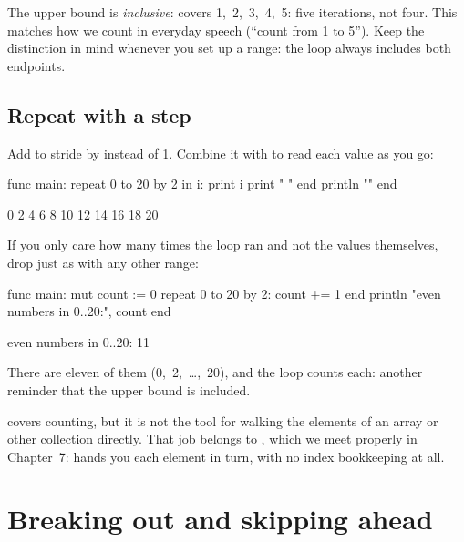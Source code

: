 \begin{note}
The upper bound is \emph{inclusive}:  covers
1,~2,~3,~4,~5: five iterations, not four. This matches how we count in everyday
speech (``count from 1 to 5''). Keep the distinction in mind whenever you set
up a range: the loop always includes both endpoints.
\end{note}

\subsection{Repeat with a step}

Add  to stride by  instead of 1. Combine it with 
to read each value as you go:

\begin{salamen}
func main:
    repeat 0 to 20 by 2 in i:
        print i
        print " "
    end
    println ""
end
\end{salamen}

\begin{progout}
0 2 4 6 8 10 12 14 16 18 20
\end{progout}

If you only care how many times the loop ran and not the values themselves,
drop  just as with any other  range:

\begin{salamen}
func main:
    mut count := 0
    repeat 0 to 20 by 2:
        count += 1
    end
    println "even numbers in 0..20:", count
end
\end{salamen}

\begin{progout}
even numbers in 0..20: 11
\end{progout}

There are eleven of them (0,~2,~\dots,~20), and the loop counts each: another
reminder that the upper bound is included.

\begin{tip}
 covers counting, but it is not the tool for walking the elements
of an array or other collection directly. That job belongs to , which
we meet properly in Chapter~7:  hands you each element
in turn, with no index bookkeeping at all.
\end{tip}

\section{Breaking out and skipping ahead}

